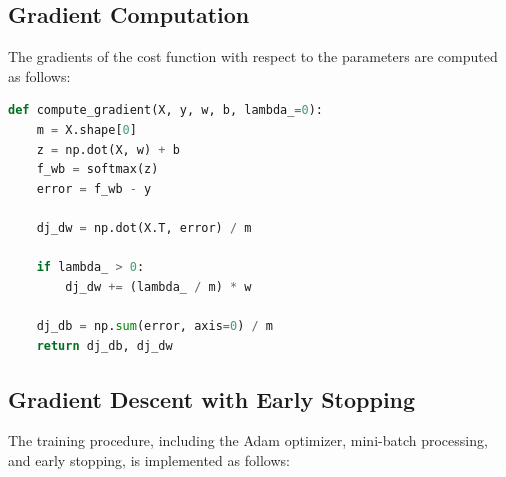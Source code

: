 \documentclass[10pt,journal,compsoc]{IEEEtran}
\begin{document}
\subsection{Gradient Computation}
The gradients of the cost function with respect to the parameters are computed as follows:

\begin{lstlisting}[language=Python]
def compute_gradient(X, y, w, b, lambda_=0):
    m = X.shape[0]
    z = np.dot(X, w) + b
    f_wb = softmax(z)
    error = f_wb - y
    
    dj_dw = np.dot(X.T, error) / m
    
    if lambda_ > 0:
        dj_dw += (lambda_ / m) * w
        
    dj_db = np.sum(error, axis=0) / m
    return dj_db, dj_dw
\end{lstlisting}

\subsection{Gradient Descent with Early Stopping}
The training procedure, including the Adam optimizer, mini-batch processing, and early stopping, is implemented as follows:
\end{document}
